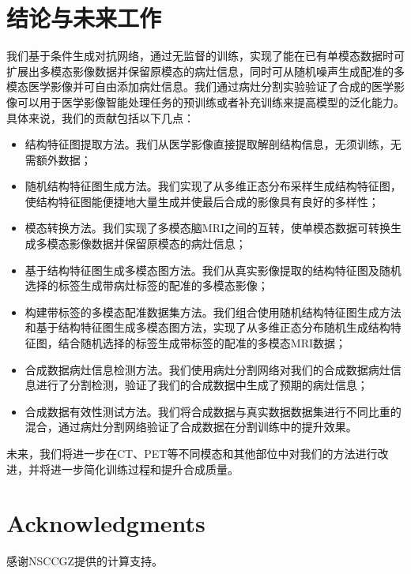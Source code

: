 \documentclass[letterpaper]{article} %
\begin{document}
\section{结论与未来工作}
我们基于条件生成对抗网络，通过无监督的训练，实现了能在已有单模态数据时可扩展出多模态影像数据并保留原模态的病灶信息，同时可从随机噪声生成配准的多模态医学影像并可自由添加病灶信息。我们通过病灶分割实验验证了合成的医学影像可以用于医学影像智能处理任务的预训练或者补充训练来提高模型的泛化能力。具体来说，我们的贡献包括以下几点：
\begin{itemize}
	\item 结构特征图提取方法。我们从医学影像直接提取解剖结构信息，无须训练，无需额外数据；
	\item 随机结构特征图生成方法。我们实现了从多维正态分布采样生成结构特征图，使结构特征图能便捷地大量生成并使最后合成的影像具有良好的多样性；
	\item 模态转换方法。我们实现了多模态脑MRI之间的互转，使单模态数据可转换生成多模态影像数据并保留原模态的病灶信息；
	\item 基于结构特征图生成多模态图方法。我们从真实影像提取的结构特征图及随机选择的标签生成带病灶标签的配准的多模态影像；
	\item 构建带标签的多模态配准数据集方法。我们组合使用随机结构特征图生成方法和基于结构特征图生成多模态图方法，实现了从多维正态分布随机生成结构特征图，结合随机选择的标签生成带标签的配准的多模态MRI数据；
	\item 合成数据病灶信息检测方法。我们使用病灶分割网络对我们的合成数据病灶信息进行了分割检测，验证了我们的合成数据中生成了预期的病灶信息；
	\item 合成数据有效性测试方法。我们将合成数据与真实数据数据集进行不同比重的混合，通过病灶分割网络验证了合成数据在分割训练中的提升效果。
\end{itemize}

未来，我们将进一步在CT、PET等不同模态和其他部位中对我们的方法进行改进，并将进一步简化训练过程和提升合成质量。	

\section{ Acknowledgments}
感谢NSCCGZ提供的计算支持。




\end{document}
